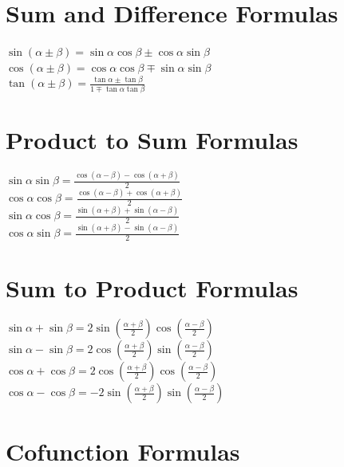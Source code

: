 \documentclass[10pt,onecolumn]{article}
\begin{document}
{\section{Sum and Difference Formulas}

\(\sin(\alpha \pm \beta) = \sin \alpha \cos \beta \pm \cos \alpha \sin \beta \) \\
\(\cos(\alpha \pm \beta) = \cos \alpha \cos \beta \mp \sin \alpha \sin \beta \) \\
\(\tan(\alpha \pm \beta) = \frac{\tan \alpha \pm \tan \beta}{1 \mp \tan \alpha \tan \beta} \) \\

\section{Product to Sum Formulas}

\(\sin \alpha \sin \beta = \frac{\cos(\alpha - \beta) - \cos(\alpha + \beta)}{2}\) \\
\(\cos \alpha \cos \beta = \frac{\cos(\alpha - \beta) + \cos(\alpha + \beta)}{2}\) \\
\(\sin \alpha \cos \beta = \frac{\sin(\alpha + \beta) + \sin(\alpha - \beta)}{2}\) \\
\(\cos \alpha \sin \beta = \frac{\sin(\alpha + \beta) - \sin(\alpha - \beta)}{2}\) \\

\section{Sum to Product Formulas}

\(\sin \alpha + \sin \beta = 2 \sin (\frac{\alpha + \beta}{2})\cos(\frac{\alpha - \beta}{2})\) \\
\(\sin \alpha - \sin \beta = 2 \cos (\frac{\alpha + \beta}{2})\sin(\frac{\alpha - \beta}{2})\) \\
\(\cos \alpha + \cos \beta = 2 \cos (\frac{\alpha + \beta}{2})\cos(\frac{\alpha - \beta}{2})\) \\
\(\cos \alpha - \cos \beta = -2 \sin (\frac{\alpha + \beta}{2})\sin(\frac{\alpha - \beta}{2})\) \\


\section{Cofunction Formulas}

}
\end{document}
